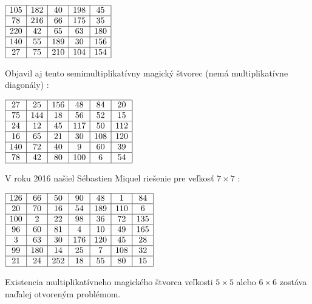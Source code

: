 \begin{center}
$\begin{array}{ |c|c|c|c|c| }
\hline
105 & 182 & 40 & 198 & 45 \\ 
\hline
78 & 216 & 66 & 175 & 35  \\ 
\hline
220 & 42 & 65 & 63 & 180 \\ 
\hline
140 & 55 & 189 & 30 & 156 \\ 
\hline
27 & 75 & 210 & 104 & 154 \\ 
\hline
\end{array}$
\end{center}

Objavil aj tento semimultiplikatívny magický štvorec (nemá multiplikatívne diagonály) \cite{multimagie}:

\begin{center}
$\begin{array}{ |c|c|c|c|c|c| }
\hline
27 & 25 & 156 & 48 & 84 & 20 \\ 
\hline
75 & 144 & 18 & 56 & 52 & 15 \\ 
\hline
24 & 12 & 45 & 117 & 50 & 112 \\ 
\hline
16 & 65 & 21 & 30 & 108 & 120 \\ 
\hline
140 & 72 & 40 & 9 & 60 & 39 \\ 
\hline
78 & 42 & 80 & 100 & 6 & 54 \\
\hline
\end{array}$
\end{center}

V roku 2016 našiel Sébastien Miquel riešenie pre veľkosť $7 \times 7$  \cite{multimagie}:

\begin{center}
$\begin{array}{ |c|c|c|c|c|c|c| } 
\hline
126 & 66 & 50 & 90 & 48 & 1 & 84 \\ 
\hline
20 & 70 & 16 & 54 & 189 & 110 & 6 \\ 
\hline
100 & 2 & 22 & 98 & 36 & 72 & 135 \\
\hline
96 & 60 & 81 & 4 & 10 & 49 & 165 \\
\hline
3 & 63 & 30 & 176 & 120 & 45 & 28 \\
\hline
99 & 180 & 14 & 25 & 7 & 108 & 32 \\
\hline
21 & 24 & 252 & 18 & 55 & 80 & 15 \\
\hline
\end{array}$
\end{center}

Existencia multiplikatívneho magického štvorca veľkosti $5 \times 5$ alebo $6 \times 6$ zostáva naďalej otvoreným problémom.











